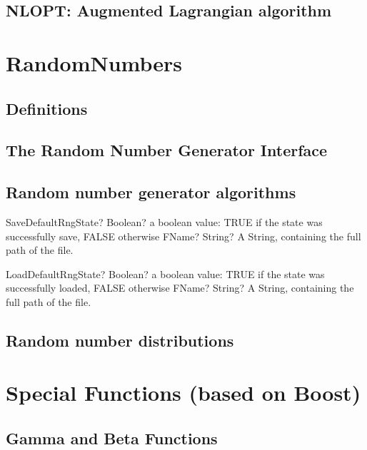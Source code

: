 \documentclass[12pt,a4paper,openany]{book}
\begin{document}
\section{NLOPT: Augmented Lagrangian algorithm}

\chapter{RandomNumbers}

\section{Definitions}

\section{The Random Number Generator Interface}

\section{Random number generator algorithms}

\begin{mpFunctionsExtract}
\mpFunctionOne
{SaveDefaultRngState? Boolean? a boolean value: TRUE if the state was successfully save, FALSE otherwise}
{FName? String? A String, containing the full path of the file.}
\end{mpFunctionsExtract}

\begin{mpFunctionsExtract}
\mpFunctionOne
{LoadDefaultRngState? Boolean? a boolean value: TRUE if the state was successfully loaded, FALSE otherwise}
{FName? String? A String, containing the full path of the file.}
\end{mpFunctionsExtract}

\section{Random number distributions}

\chapter{Special Functions (based on Boost)}

\section{Gamma and Beta Functions}
\end{document}
